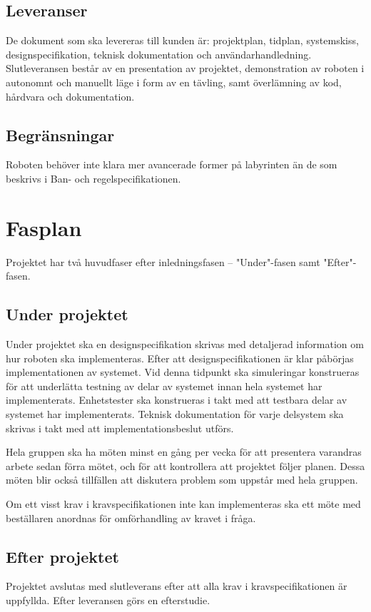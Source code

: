 \documentclass[a4paper,titlepage,12pt]{article}
\begin{document}
	
	\subsection{Leveranser}
	De dokument som ska levereras till kunden är: projektplan, tidplan,
	systemskiss, designspecifikation, teknisk dokumentation och
	användarhandledning. Slutleveransen består av en presentation av projektet,
	demonstration av roboten i autonomnt och manuellt läge i form av en tävling,
	samt överlämning av kod, hårdvara och dokumentation.
	
	
	\subsection{Begränsningar}
	Roboten behöver inte klara mer avancerade former på labyrinten än de som
	beskrivs i Ban- och regelspecifikationen.
	
	
	\section{Fasplan}
    Projektet har två huvudfaser efter inledningsfasen -- "Under"-fasen samt
    "Efter"-fasen.
	
	\subsection{Under projektet}
	Under projektet ska en designspecifikation skrivas med detaljerad
	information om hur roboten ska implementeras. Efter att
	designspecifikationen är klar påbörjas implementationen av systemet. Vid
    denna tidpunkt ska simuleringar konstrueras för att underlätta testning av
    delar av systemet innan hela systemet har implementerats.
	Enhetstester ska konstrueras i takt med att testbara delar av systemet har
	implementerats. Teknisk dokumentation för varje delsystem ska skrivas
	i takt med att implementationsbeslut utförs.

	Hela gruppen ska ha möten minst en gång per vecka för att presentera
	varandras arbete sedan förra mötet, och för att kontrollera att projektet
	följer planen. Dessa möten blir också tillfällen att diskutera problem som
	uppstår med hela gruppen.

	Om ett visst krav i kravspecifikationen inte kan implementeras ska ett möte
	med beställaren anordnas för omförhandling av kravet i fråga.
	
	\subsection{Efter projektet}
	Projektet avslutas med slutleverans efter att alla krav i
	kravspecifikationen är uppfyllda. Efter leveransen görs en efterstudie.
	
\end{document}
